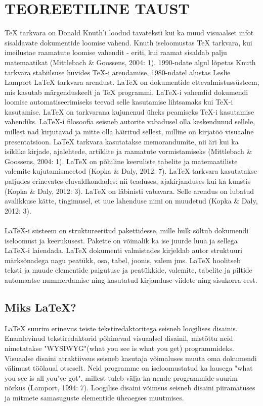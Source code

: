 \documentclass{21kuur}
\begin{document}
\chapter{TEOREETILINE TAUST}
TeX tarkvara on Donald Knuth'i loodud tavateksti kui ka muud visuaalset infot sisaldavate dokumentide loomise vahend. Knuth iseloomustas TeX tarkvara, kui imeilustae raamatute loomise vahendit - eriti, kui raamat sisaldab palju matemaatikat (Mittlebach \& Goossens, 2004: 1). 1990-ndate algul lõpetas Knuth tarkvara stabiilsuse huvides TeX-i arendamise. 1980-ndatel alustas Leslie Lamport LaTeX tarkvara arendust. LaTeX on dokumentide ettevalmistussüsteem, mis kasutab märgenduskeelt ja TeX programmi. LaTeX-i vahendid dokumendi loomise automatiseerimiseks teevad selle kasutamise lihtsamaks kui TeX-i kasutamise. LaTeX on tarkvarana kujunenud üheks peamiseks TeX-i kasutamise vahendiks. LaTeX-i filosoofia seisneb autorite vabadusel olla keskendunud sellele, millest nad kirjutavad ja mitte olla häiritud sellest, milline on kirjatöö visuaalne presentatsioon. LaTeX tarkvara kasutatakse memorandumite, nii äri kui ka isiklike kirjade, ajalehtede, artiklite ja raamatute vormistamiseks (Mittlebach \& Goossens, 2004: 1). LaTeX on põhiline keeruliste tabelite ja matemaatiliste valemite kujutamismeetod (Kopka \& Daly, 2012: 7). LaTeX tarkvara kasutatakse paljudes erinevates eluvaldkondades: nii teaduses, ajakirjanduses kui ka kunstis (Kopka \& Daly, 2012: 3). LaTeX on läbinisti vabavara. Selle arendus on lubatud avalikkuse kätte, tingimusel, et uue lahenduse nimi on muudetud (Kopka \& Daly, 2012: 3). 
\\\\LaTeX-i süsteem on struktureeritud pakettidesse, mille hulk sõltub dokumendi iseloomust ja keerukusest. Pakette on võimalik ka ise juurde luua ja sellega LaTeX-i laiendada. LaTeX dokumenti valmistades kirjeldab autor struktuuri märksõnadega nagu peatükk, osa, tabel, joonis, valem jms. LaTeX hoolitseb teksti ja muude elementide paigutuse ja peatükkide, valemite, tabelite ja piltide automaatse nummerdamise ning kasutatud kirjanduse viidete ning sisukorra eest.

\section{Miks LaTeX?}
LaTeX suurim erinevus teiste tekstiredaktoritega seisneb loogilises disainis. Enamlevinud tekstiredaktorid põhinevad visuaalsel disainil, mistõttu neid nimetatakse "WYSIWYG"(what you see is what you get) programmideks. Visuaalse disaini atraktiivsus seisneb kasutaja võimaluses muuta oma dokumendi välimust töölaual otseselt. Neid programme on iseloomustatud ka lausega "what you see is all you've got", millest tuleb välja ka nende programmide suurim nõrkus (Lamport, 1994: 7). Loogilise disaini võimsus seisneb disaini piiramatuses ja mitmete samasuguste elementide üheaegses muutmises. 
\end{document}
